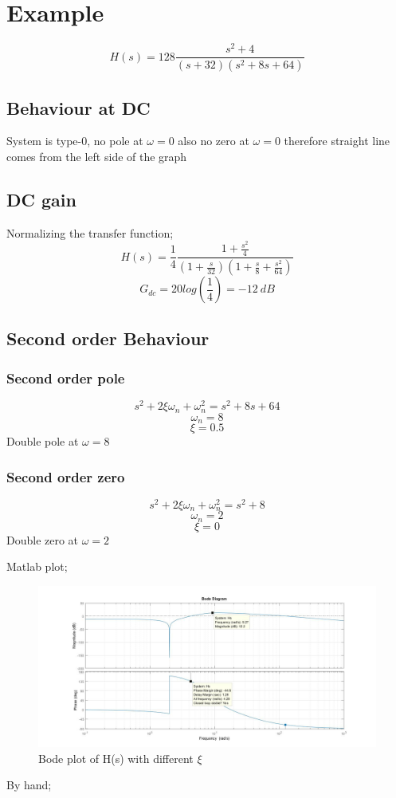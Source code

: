 \documentclass[11pt]{article}
\begin{document}
\section*{Example}
\[H(s)=128\frac{s^2+4}{(s+32)(s^2+8s+64)}\]
\subsection*{Behaviour at DC}
System is type-0, no pole at $\omega = 0$ also no zero at $\omega = 0$ therefore straight line comes from the left side of the graph

\subsection*{DC gain}
Normalizing the transfer function;
\[H(s)=\frac{1}{4}\frac{1+\frac{s^2}{4}}{(1+\frac{s}{32})(1+\frac{s}{8}+\frac{s^2}{64})}\]
\[G_{dc}=20log(\frac{1}{4})=-12\> dB\]

\subsection*{Second order Behaviour}
\subsubsection*{Second order pole}
\[s^2+2 \xi \omega_n+ \omega_n^2=s^2+8s+64\]
\[\omega_n=8\]
\[\xi=0.5\]
Double pole at $\omega = 8$
\subsubsection*{Second order zero}
\[s^2+2 \xi \omega_n+ \omega_n^2=s^2+8\]
\[\omega_n=2\]
\[\xi=0\]
Double zero at $\omega=2$

Matlab plot;
\begin{figure}[H]
  \includegraphics[scale=0.5, center]{sikinti}
  \caption{Bode plot of H(s) with different $\xi$}
  \label{fig:zero}
\end{figure}
By hand;
\end{document}
